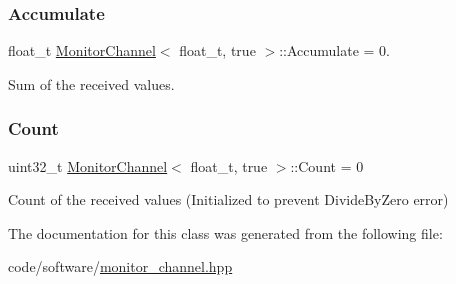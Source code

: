 \subsubsection{\texorpdfstring{Accumulate}{Accumulate}}
{\footnotesize\ttfamily float\+\_\+t \hyperlink{classMonitorChannel}{Monitor\+Channel}$<$ float\+\_\+t, true $>$\+::Accumulate = 0.}



Sum of the received values. 

\mbox{\label{classMonitorChannel_3_01float__t_00_01true_01_4_ad62fe4fb25e1877eb23333448ad101d2}} 
\subsubsection{\texorpdfstring{Count}{Count}}
{\footnotesize\ttfamily uint32\+\_\+t \hyperlink{classMonitorChannel}{Monitor\+Channel}$<$ float\+\_\+t, true $>$\+::Count = 0}



Count of the received values (Initialized to prevent Divide\+By\+Zero error) 



The documentation for this class was generated from the following file\+:\begin{DoxyCompactItemize}
\item 
code/software/\hyperlink{monitor__channel_8hpp}{monitor\+\_\+channel.\+hpp}\end{DoxyCompactItemize}
